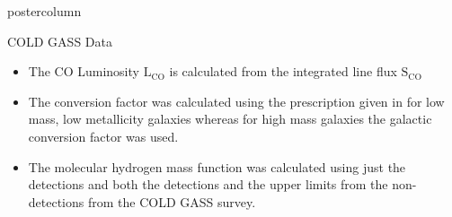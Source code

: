 \documentclass{beamer}
\begin{document}
\begin{frame}
\begin{columns}
\begin{column}{.5\textwidth}
\begin{beamercolorbox}[center,wd=\textwidth]{postercolumn}
\begin{minipage}[T]{.95\textwidth}
{\begin{myblock}{\LARGE COLD GASS Data}
            \begin{itemize}
              \item The CO Luminosity $\mathrm{L_{CO}}$ is calculated from the
              integrated line flux $\mathrm{S_{CO}}$
              \item The conversion factor was calculated using the prescription
              given in \cite{genzel2012metallicity} for low mass, low metallicity
              galaxies whereas for high mass galaxies the galactic conversion
              factor was used.
              \item The molecular hydrogen mass function was calculated using
              just the detections and both the detections
              and the upper limits from the non-detections from the COLD GASS
              survey.
            \end{itemize}


\end{myblock}}
\end{minipage}
\end{beamercolorbox}
\end{column}
\end{columns}
\end{frame}
\end{document}
